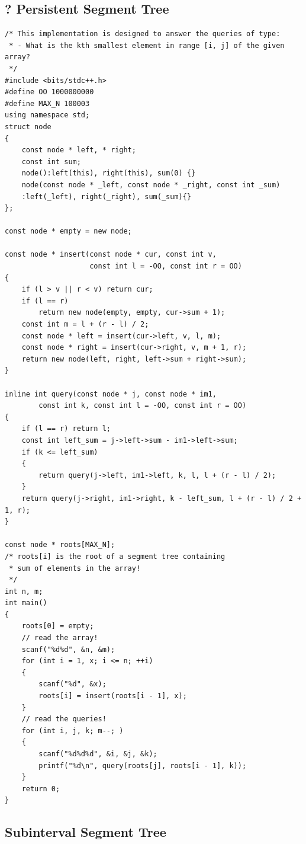 \documentclass[12pt]{book}
\begin{document}
\subsection{? Persistent Segment Tree}
\begin{verbatim}
/* This implementation is designed to answer the queries of type:
 * - What is the kth smallest element in range [i, j] of the given array?
 */
#include <bits/stdc++.h>
#define OO 1000000000
#define MAX_N 100003
using namespace std;
struct node
{
	const node * left, * right;
	const int sum;
	node():left(this), right(this), sum(0) {}
	node(const node * _left, const node * _right, const int _sum)
	:left(_left), right(_right), sum(_sum){}
};

const node * empty = new node;

const node * insert(const node * cur, const int v,
                    const int l = -OO, const int r = OO)
{
	if (l > v || r < v) return cur;
	if (l == r)
		return new node(empty, empty, cur->sum + 1);
	const int m = l + (r - l) / 2;
	const node * left = insert(cur->left, v, l, m);
	const node * right = insert(cur->right, v, m + 1, r);
	return new node(left, right, left->sum + right->sum);
}

inline int query(const node * j, const node * im1,
		const int k, const int l = -OO, const int r = OO)
{
	if (l == r) return l;
	const int left_sum = j->left->sum - im1->left->sum;
	if (k <= left_sum)
	{
		return query(j->left, im1->left, k, l, l + (r - l) / 2);
	}
	return query(j->right, im1->right, k - left_sum, l + (r - l) / 2 + 1, r);
}

const node * roots[MAX_N];
/* roots[i] is the root of a segment tree containing
 * sum of elements in the array!
 */
int n, m;
int main()
{
	roots[0] = empty;
	// read the array!
	scanf("%d%d", &n, &m);
	for (int i = 1, x; i <= n; ++i)
	{
		scanf("%d", &x);
		roots[i] = insert(roots[i - 1], x);
	}
	// read the queries!
	for (int i, j, k; m--; )
	{
		scanf("%d%d%d", &i, &j, &k);
		printf("%d\n", query(roots[j], roots[i - 1], k));
	}
	return 0;
}
\end{verbatim}
\subsection{Subinterval Segment Tree}
\end{document}
